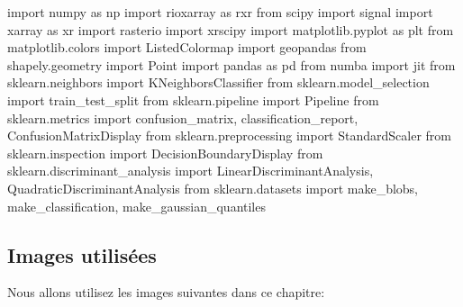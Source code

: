 \documentclass[
  11pt,
  letterpaper,
  open=any,
  twoside=false,
  french]{scrbook}
\newenvironment{Shaded}{\begin{snugshade}}{\end{snugshade}}
\newcommand{\ImportTok}[1]{\textcolor[rgb]{0.00,0.46,0.62}{#1}}
\newcommand{\NormalTok}[1]{\textcolor[rgb]{0.00,0.23,0.31}{#1}}
\begin{document}
\begin{Shaded}
\begin{Highlighting}[]
\ImportTok{import}\NormalTok{ numpy }\ImportTok{as}\NormalTok{ np}
\ImportTok{import}\NormalTok{ rioxarray }\ImportTok{as}\NormalTok{ rxr}
\ImportTok{from}\NormalTok{ scipy }\ImportTok{import}\NormalTok{ signal}
\ImportTok{import}\NormalTok{ xarray }\ImportTok{as}\NormalTok{ xr}
\ImportTok{import}\NormalTok{ rasterio}
\ImportTok{import}\NormalTok{ xrscipy}
\ImportTok{import}\NormalTok{ matplotlib.pyplot }\ImportTok{as}\NormalTok{ plt}
\ImportTok{from}\NormalTok{ matplotlib.colors }\ImportTok{import}\NormalTok{ ListedColormap}
\ImportTok{import}\NormalTok{ geopandas}
\ImportTok{from}\NormalTok{ shapely.geometry }\ImportTok{import}\NormalTok{ Point}
\ImportTok{import}\NormalTok{ pandas }\ImportTok{as}\NormalTok{ pd}
\ImportTok{from}\NormalTok{ numba }\ImportTok{import}\NormalTok{ jit}
\ImportTok{from}\NormalTok{ sklearn.neighbors }\ImportTok{import}\NormalTok{ KNeighborsClassifier}
\ImportTok{from}\NormalTok{ sklearn.model\_selection }\ImportTok{import}\NormalTok{ train\_test\_split}
\ImportTok{from}\NormalTok{ sklearn.pipeline }\ImportTok{import}\NormalTok{ Pipeline}
\ImportTok{from}\NormalTok{ sklearn.metrics }\ImportTok{import}\NormalTok{ confusion\_matrix, classification\_report, ConfusionMatrixDisplay}
\ImportTok{from}\NormalTok{ sklearn.preprocessing }\ImportTok{import}\NormalTok{ StandardScaler}
\ImportTok{from}\NormalTok{ sklearn.inspection }\ImportTok{import}\NormalTok{ DecisionBoundaryDisplay}
\ImportTok{from}\NormalTok{ sklearn.discriminant\_analysis }\ImportTok{import}\NormalTok{ LinearDiscriminantAnalysis, QuadraticDiscriminantAnalysis}
\ImportTok{from}\NormalTok{ sklearn.datasets }\ImportTok{import}\NormalTok{ make\_blobs, make\_classification, make\_gaussian\_quantiles}
\end{Highlighting}
\end{Shaded}

\subsection{Images utilisées}\label{images-utilisuxe9es-2}

Nous allons utilisez les images suivantes dans ce chapitre:
\end{document}
